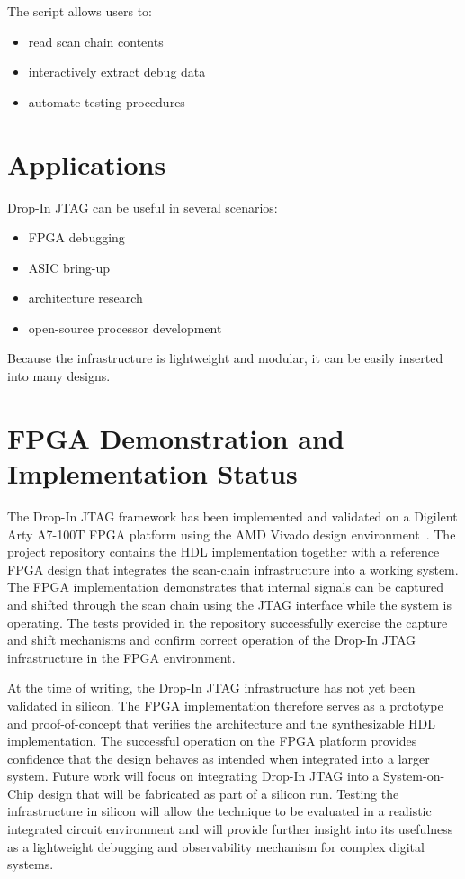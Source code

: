 \documentclass[10pt]{article}
\begin{document}
The script allows users to:

\begin{itemize}
\item read scan chain contents
\item interactively extract debug data
\item automate testing procedures
\end{itemize}

\section{Applications}

Drop-In JTAG can be useful in several scenarios:
\begin{itemize}
\item FPGA debugging
\item ASIC bring-up
\item architecture research
\item open-source processor development
\end{itemize}
Because the infrastructure is lightweight and modular, it can be easily inserted into many designs.

\section{FPGA Demonstration and Implementation Status}

The Drop-In JTAG framework has been implemented and validated on a Digilent Arty A7-100T FPGA platform using the AMD Vivado design environment~\cite{arty_a7_100t}. The project repository contains the HDL implementation together with a reference FPGA design that integrates the scan-chain infrastructure into a working system. The FPGA implementation demonstrates that internal signals can be captured and shifted through the scan chain using the JTAG interface while the system is operating. The tests provided in the repository successfully exercise the capture and shift mechanisms and confirm correct operation of the Drop-In JTAG infrastructure in the FPGA environment.

At the time of writing, the Drop-In JTAG infrastructure has not yet been validated in silicon. The FPGA implementation therefore serves as a prototype and proof-of-concept that verifies the architecture and the synthesizable HDL implementation. The successful operation on the FPGA platform provides confidence that the design behaves as intended when integrated into a larger system. Future work will focus on integrating Drop-In JTAG into a System-on-Chip design that will be fabricated as part of a silicon run. Testing the infrastructure in silicon will allow the technique to be evaluated in a realistic integrated circuit environment and will provide further insight into its usefulness as a lightweight debugging and observability mechanism for complex digital systems.
\end{document}
